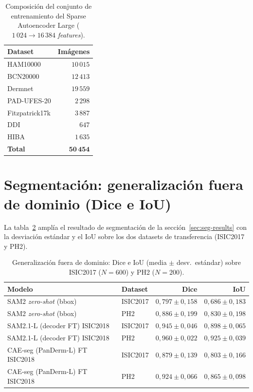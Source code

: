 \begin{table}[H]
\centering
\footnotesize
\setlength{\tabcolsep}{4pt}
\caption{Composición del conjunto de entrenamiento del Sparse
Autoencoder Large ($1\,024 \to 16\,384$ \emph{features}).}
\label{tab:anexob-sae-train}
\begin{tabular}{lr}
\hline
Dataset            & Imágenes \\
\hline
HAM10000           & $10\,015$ \\
BCN20000           & $12\,413$ \\
Dermnet            & $19\,559$ \\
PAD-UFES-20        & $2\,298$ \\
Fitzpatrick17k     & $3\,887$ \\
DDI                & $647$ \\
HIBA               & $1\,635$ \\
\hline
\textbf{Total}     & $\mathbf{50\,454}$ \\
\hline
\end{tabular}
\end{table}

\section{Segmentación: generalización fuera de dominio (Dice e IoU)}
\label{sec:anexob-seg-ood}

La tabla~\ref{tab:seg-detalle} amplía el resultado de segmentación de
la sección~\ref{sec:seg-results} con la desviación estándar y el IoU
sobre los dos datasets de transferencia (ISIC2017 y PH2).

\begin{table}[H]
\centering
\footnotesize
\setlength{\tabcolsep}{4pt}
\caption{Generalización fuera de dominio: Dice e IoU (media $\pm$
desv.~estándar) sobre ISIC2017 ($N = 600$) y PH2 ($N = 200$).}
\label{tab:seg-detalle}
\begin{tabular}{llrr}
\hline
Modelo                              & Dataset      & Dice              & IoU \\
\hline
SAM2 \emph{zero-shot} (bbox)        & ISIC2017     & $0{,}797 \pm 0{,}158$ & $0{,}686 \pm 0{,}183$ \\
SAM2 \emph{zero-shot} (bbox)        & PH2          & $0{,}886 \pm 0{,}199$ & $0{,}830 \pm 0{,}198$ \\
SAM2.1-L (decoder FT) ISIC2018      & ISIC2017     & $0{,}945 \pm 0{,}046$ & $0{,}898 \pm 0{,}065$ \\
SAM2.1-L (decoder FT) ISIC2018      & PH2          & $0{,}960 \pm 0{,}022$ & $0{,}925 \pm 0{,}039$ \\
CAE-seg (PanDerm-L) FT ISIC2018     & ISIC2017     & $0{,}879 \pm 0{,}139$ & $0{,}803 \pm 0{,}166$ \\
CAE-seg (PanDerm-L) FT ISIC2018     & PH2          & $0{,}924 \pm 0{,}066$ & $0{,}865 \pm 0{,}098$ \\
\hline
\end{tabular}
\end{table}

